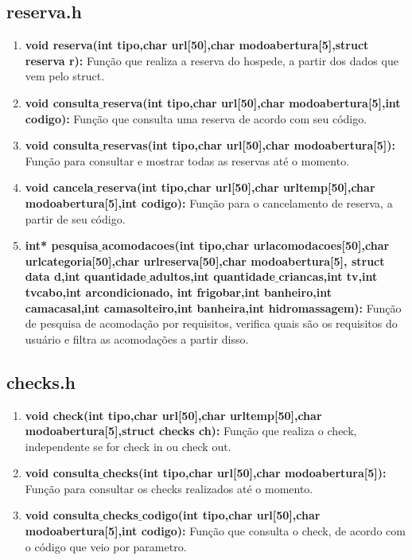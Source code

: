 \documentclass{article}
\begin{document}
\subsection{reserva.h}
\begin{enumerate}
	\item \textbf{void reserva(int tipo,char url[50],char modoabertura[5],struct reserva r): }Função que realiza a reserva do hospede, a partir dos dados que vem pelo struct.\\
	\item \textbf{void consulta$\_$reserva(int tipo,char url[50],char modoabertura[5],int codigo): }Função que consulta uma reserva de acordo com seu código.\\
	\item \textbf{void consulta$\_$reservas(int tipo,char url[50],char modoabertura[5]): }Função para consultar e mostrar todas as reservas até o momento.\\
	\item \textbf{void cancela$\_$reserva(int tipo,char url[50],char urltemp[50],char modoabertura[5],int codigo): }Função para o cancelamento de reserva, a partir de seu código.\\
	\item \textbf{int* pesquisa$\_$acomodacoes(int tipo,char urlacomodacoes[50],char urlcategoria[50],char urlreserva[50],char modoabertura[5],
	struct data d,int quantidade$\_$adultos,int quantidade$\_$criancas,int tv,int tvcabo,int arcondicionado,
	int frigobar,int banheiro,int camacasal,int camasolteiro,int banheira,int hidromassagem): }Função de pesquisa de acomodação por requisitos, verifica quais são os requisitos do usuário e filtra as acomodações a partir disso.\\
\end{enumerate}
\subsection{checks.h}
\begin{enumerate}
	\item \textbf{void check(int tipo,char url[50],char urltemp[50],char modoabertura[5],struct checks ch): }Função que realiza o check, independente se for check in ou check out.\\
	\item \textbf{void consulta$\_$checks(int tipo,char url[50],char modoabertura[5]): }Função para consultar os checks realizados até o momento.\\
	\item \textbf{void consulta$\_$checks$\_$codigo(int tipo,char url[50],char modoabertura[5],int codigo): }Função que consulta o check, de acordo com o código que veio por parametro.\\
\end{enumerate}
\end{document}
